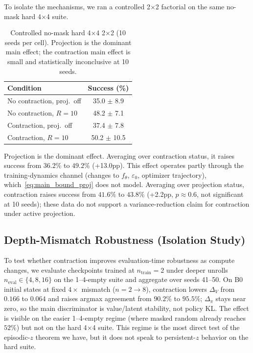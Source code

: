 \documentclass{article}
\theoremstyle{plain}
\theoremstyle{definition}
\theoremstyle{remark}
\begin{document}
To isolate the mechanisms, we ran a controlled 2$\times$2 factorial on the same no-mask hard 4$\times$4 suite.

\begin{table}[t]
\caption{Controlled no-mask hard 4$\times$4 2$\times$2 (10 seeds per cell). Projection is the dominant main effect; the contraction main effect is small and statistically inconclusive at 10 seeds.}
\label{tab:controlled_2x2_main}
\centering
\small
\begin{tabular}{@{}lc@{}}
\toprule
Condition & Success (\%) \\
\midrule
No contraction, proj.\ off & 35.0 $\pm$ 8.9 \\
No contraction, $R{=}10$ & 48.2 $\pm$ 7.1 \\
Contraction, proj.\ off & 37.4 $\pm$ 7.8 \\
Contraction, $R{=}10$ & 50.2 $\pm$ 10.5 \\
\bottomrule
\end{tabular}
\end{table}

Projection is the dominant effect. Averaging over contraction status, it raises success from $36.2\%$ to $49.2\%$ (+13.0pp). This effect operates partly through the training-dynamics channel (changes to $f_\theta$, $\varepsilon_0$, optimizer trajectory), which~\eqref{eq:main_bound_proj} does not model. Averaging over projection status, contraction raises success from $41.6\%$ to $43.8\%$ (+2.2pp, $p\approx0.6$, not significant at 10 seeds); these data do not support a variance-reduction claim for contraction under active projection.

\subsection{Depth-Mismatch Robustness (Isolation Study)}
\label{sec:isolation_study}
\label{app:depth_mismatch_main}

To test whether contraction improves evaluation-time robustness as compute changes, we evaluate checkpoints trained at $n_{\mathrm{train}}{=}2$ under deeper unrolls $n_{\mathrm{eval}}\in\{4,8,16\}$ on the 1--4-empty suite and aggregate over seeds 41--50. On B0 initial states at fixed $4\times$ mismatch ($n{=}2\rightarrow 8$), contraction lowers $\Delta_V$ from $0.166$ to $0.064$ and raises argmax agreement from $90.2\%$ to $95.5\%$; $\Delta_\pi$ stays near zero, so the main discriminator is value/latent stability, not policy KL. The effect is visible on the easier 1--4-empty regime (where masked random already reaches $52\%$) but not on the hard 4$\times$4 suite. This regime is the most direct test of the episodic-$z$ theorem we have, but it does not speak to persistent-$z$ behavior on the hard suite.
\end{document}

